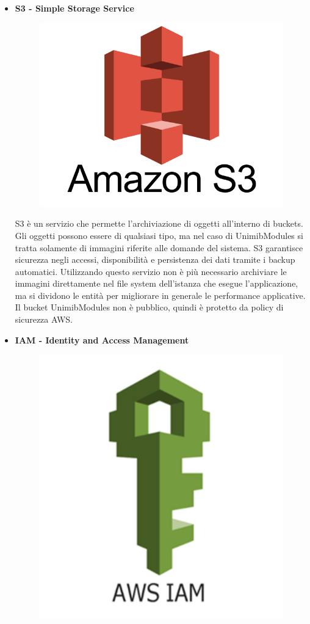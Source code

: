\documentclass[12pt]{article}
\begin{document}
\begin{itemize}
\item \textbf{S3 - Simple Storage Service}
\begin{figure}[H]
\includegraphics[scale=0.2, left]{s3.png}
\end{figure}
S3 è un servizio che permette l'archiviazione di oggetti all'interno di buckets. Gli oggetti possono essere di qualsiasi tipo, ma nel caso di UnimibModules si tratta solamente di immagini riferite alle domande del sistema. S3 garantisce sicurezza negli accessi, disponibilità e persistenza dei dati tramite i backup automatici. Utilizzando questo servizio non è più necessario archiviare le immagini direttamente nel file system dell'istanza che esegue l'applicazione, ma si dividono le entità per migliorare in generale le performance applicative. Il bucket UnimibModules non è pubblico, quindi è protetto da policy di sicurezza AWS.
\item \textbf{IAM - Identity and Access Management}
\begin{figure}[H]
\includegraphics[scale=0.2, left]{iam.png}

\end{figure}
\end{itemize}
\end{document}
